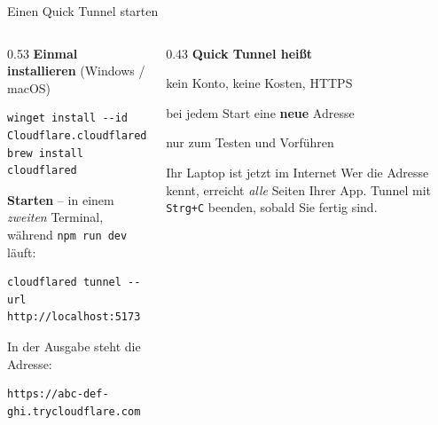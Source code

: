 \begin{frame}[fragile]{Einen Quick Tunnel starten}
  \footnotesize
  \begin{columns}[onlytextwidth,t]
    \begin{column}{0.53\textwidth}
      \textbf{Einmal installieren} (Windows / macOS)
\begin{lstlisting}[style=term]
winget install --id Cloudflare.cloudflared
brew install cloudflared
\end{lstlisting}
      \textbf{Starten} -- in einem \emph{zweiten} Terminal,
      während \texttt{npm run dev} läuft:
\begin{lstlisting}[style=term]
cloudflared tunnel --url http://localhost:5173
\end{lstlisting}
      In der Ausgabe steht die Adresse:
\begin{lstlisting}[style=term]
https://abc-def-ghi.trycloudflare.com
\end{lstlisting}
    \end{column}
    \begin{column}{0.43\textwidth}
      \textbf{Quick Tunnel heißt}
      \begin{tugitemize}
        \item[\itemPlus] kein Konto, keine Kosten, HTTPS
        \item[\itemMinus] bei jedem Start eine \textbf{neue} Adresse
        \item[\itemMinus] nur zum Testen und Vorführen
      \end{tugitemize}
      \begin{alertblock}{Ihr Laptop ist jetzt im Internet}
        \footnotesize Wer die Adresse kennt, erreicht \emph{alle} Seiten Ihrer App.
        Tunnel mit \texttt{Strg+C} beenden, sobald Sie fertig sind.
      \end{alertblock}
    \end{column}
  \end{columns}
\end{frame}

